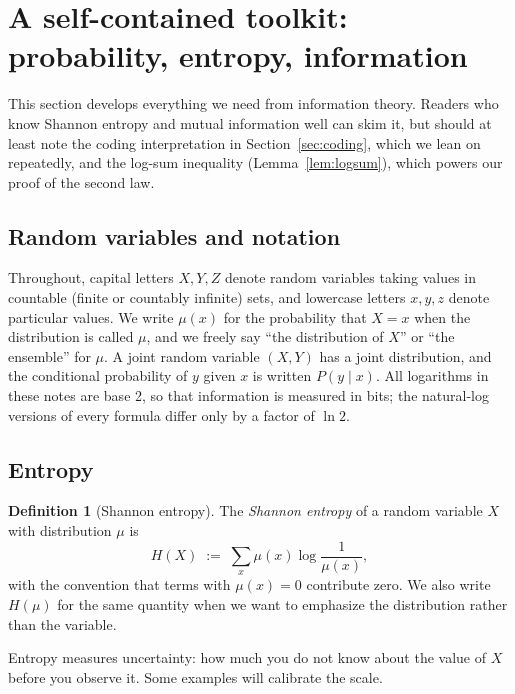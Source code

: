 \documentclass[10pt]{article}
\theoremstyle{definition}
\newtheorem{definition}[theorem]{Definition}
\theoremstyle{remark}
\begin{document}
\section{A self-contained toolkit: probability, entropy, information}
\label{sec:prelim}

This section develops everything we need from information theory. Readers who know Shannon entropy and mutual information well can skim it, but should at least note the coding interpretation in Section~\ref{sec:coding}, which we lean on repeatedly, and the log-sum inequality (Lemma~\ref{lem:logsum}), which powers our proof of the second law.

\subsection{Random variables and notation}

Throughout, capital letters $X, Y, Z$ denote random variables taking values in countable (finite or countably infinite) sets, and lowercase letters $x, y, z$ denote particular values. We write $\mu(x)$ for the probability that $X = x$ when the distribution is called $\mu$, and we freely say ``the distribution of $X$'' or ``the ensemble'' for $\mu$. A joint random variable $(X, Y)$ has a joint distribution, and the conditional probability of $y$ given $x$ is written $P(y \mid x)$. All logarithms in these notes are base 2, so that information is measured in bits; the natural-log versions of every formula differ only by a factor of $\ln 2$.

\subsection{Entropy}

\begin{definition}[Shannon entropy]
\label{def:entropy}
The \emph{Shannon entropy} of a random variable $X$ with distribution $\mu$ is
\[
H(X) \;:=\; \sum_{x} \mu(x) \log \frac{1}{\mu(x)},
\]
with the convention that terms with $\mu(x) = 0$ contribute zero. We also write $H(\mu)$ for the same quantity when we want to emphasize the distribution rather than the variable.
\end{definition}

Entropy measures uncertainty: how much you do not know about the value of $X$ before you observe it. Some examples will calibrate the scale.
\end{document}
